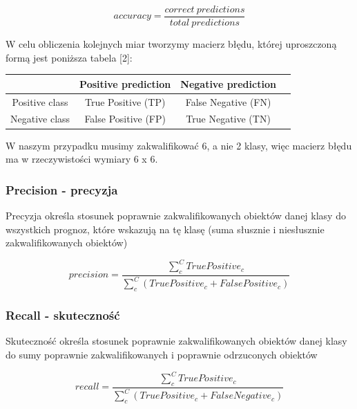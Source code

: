 \documentclass{classrep}
\begin{document}
\begin{equation}
accuracy = \frac{correct\ predictions}{total\ predictions}
\end{equation}

W celu obliczenia kolejnych miar tworzymy macierz błędu, której uproszczoną formą jest poniższa tabela [2]:

\begin{center}
	\begin{tabular}{ |c|c|c|c| } 
	\hline
	 & Positive prediction & Negative prediction \\
	\hline
	Positive class & True Positive (TP) & False Negative (FN) \\ 
	\hline
	Negative class & False Positive (FP) & True Negative (TN) \\ 
	\hline
	\end{tabular}
\end{center}

W naszym przypadku musimy zakwalifikować 6, a nie 2 klasy, więc macierz błędu ma w rzeczywistości wymiary 6 x 6.

\subsubsection{Precision - precyzja}
Precyzja określa stosunek poprawnie zakwalifikowanych obiektów danej klasy do wszystkich prognoz, które wskazują na tę klasę (suma słusznie i niesłusznie zakwalifikowanych obiektów)

\begin{equation}
precision = \frac{\sum_{c}^C{True Positive_c}}{\sum_{c}^C({True Positive_c + False Positive_c})}
\end{equation}

\subsubsection{Recall - skuteczność}
Skuteczność określa stosunek poprawnie zakwalifikowanych obiektów danej klasy do sumy poprawnie zakwalifikowanych i poprawnie odrzuconych obiektów 

\begin{equation}
recall = \frac{\sum_{c}^C{True Positive_c}}{\sum_{c}^C({True Positive_c + False Negative_c})}
\end{equation}
\end{document}
